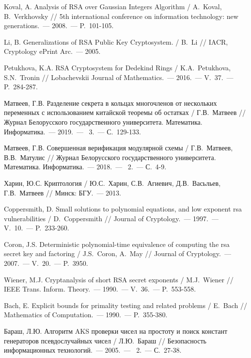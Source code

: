 \documentclass[_00_dissertation.tex]{subfiles}
\begin{document}
\begin{thebibliography}{99}
    Koval, A. Analysis of RSA over Gaussian Integers Algorithm / A.~Koval, B.~Verkhovsky // 5th international conference on information technology: new generations.~--- 2008.~--- P.~101-105.

    Li, B. Generalizations of RSA Public Key Cryptosystem. / B.~Li // IACR, Cryptology ePrint Arc.~--- 2005.

    Petukhova, K.A. RSA Cryptosystem for Dedekind Rings / K.A.~Petukhova, S.N.~Tronin // Lobachevskii Journal of Mathematics.~--- 2016.~--- V.~37.~--- P.~284-287.

    Матвеев, Г.В. Разделение секрета в кольцах многочленов от нескольких переменных с использованием китайской теоремы об остатках / Г.В.~Матвеев // Журнал Белорусского государственного университета. Математика. Информатика.~--- 2019.~--- \textnumero~3.~--- С.~129-133.

    Матвеев, Г.В. Совершенная верификация модулярной схемы / Г.В.~Матвеев, В.В.~Матулис // Журнал Белорусского государственного университета. Математика. Информатика.~--- 2018.~--- \textnumero~2.~--- С.~4-9.

    Харин, Ю.С. Криптология / Ю.С.~Харин, С.В.~Агиевич, Д.В.~Васьльев, Г.В.~Матвеев // Минск: БГУ.~--- 2013.

    Coppersmith, D. Small solutions to polynomial equations, and low exponent rsa vulnerabilities / D.~Coppersmith // Journal of Cryptology.~--- 1997.~--- V.~10.~--- P.~233-260.

    Coron, J.S. Deterministic polynomial-time equivalence of computing the rsa secret key and factoring / J.S.~Coron, A.~May // Journal of Cryptology.~--- 2007.~--- V.~20.~--- P.~3950.

    Wiener, M.J. Cryptanalysis of short RSA secret exponents / M.J.~Wiener // IEEE Trans. Inform. Theory.~--- 1990.~--- V.~36.~--- P.~553-558.

    Bach, E. Explicit bounds for primality testing and related problems / E.~Bach // Mathematics of Computation.~--- 1990.~--- P.~355-380.

    Бараш, Л.Ю. Алгоритм AKS проверки чисел на простоту и поиск констант генераторов псевдослучайных чисел / Л.Ю.~Бараш // Безопасность информационных технологий.~--- 2005.~--- \textnumero~2.~--- С.~27-38.


\end{thebibliography}
\end{document}
